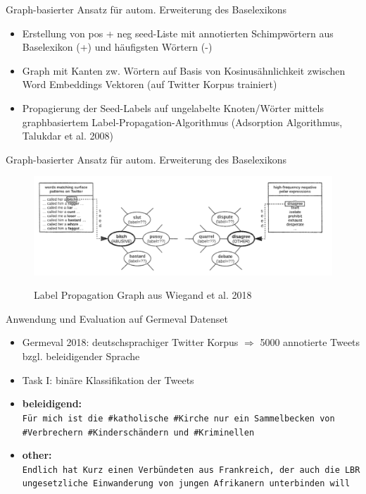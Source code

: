\documentclass{beamer}
\begin{document}
\begin{frame}{Graph-basierter Ansatz für autom. Erweiterung des Baselexikons}
\begin{itemize}
\item Erstellung von pos + neg seed-Liste mit annotierten Schimpwörtern aus Baselexikon (+) und häufigsten Wörtern (-)
\item Graph mit Kanten zw. Wörtern auf Basis von Kosinusähnlichkeit zwischen Word Embeddings Vektoren (auf Twitter Korpus trainiert)
\item Propagierung der Seed-Labels auf ungelabelte Knoten/Wörter mittels graphbasiertem Label-Propagation-Algorithmus (Adsorption Algorithmus, Talukdar et al. 2008)
\end{itemize}
\end{frame}

\begin{frame}[plain, t]
{Graph-basierter Ansatz für autom. Erweiterung des Baselexikons}
\bigskip
\bigskip
\center
\begin{figure}[hbt]
    \begin{center}
        \includegraphics[width=\textwidth,height=0.95\textheight,keepaspectratio]{graph.png}\\
    \end{center}
\caption{Label Propagation Graph aus Wiegand et al. 2018}\label{preprocess}
\end{figure}

\end{frame}



\begin{frame}[fragile]{Anwendung und Evaluation auf Germeval Datenset}
\begin{itemize}
\item Germeval 2018: deutschsprachiger Twitter Korpus $\Rightarrow$ 5000 annotierte Tweets bzgl. beleidigender Sprache
\item Task I: binäre Klassifikation der Tweets
\item \textbf{beleidigend:} \\ \footnotesize \texttt{Für mich ist die \#katholische \#Kirche nur ein Sammelbecken von \#Verbrechern \#Kinderschändern und \#Kriminellen}
\item \normalsize \textbf{other:} \\ \footnotesize \texttt{Endlich hat Kurz einen Verbündeten aus Frankreich, der auch die LBR ungesetzliche Einwanderung von jungen Afrikanern unterbinden will}
\end{itemize}
\end{frame}
\end{document}
